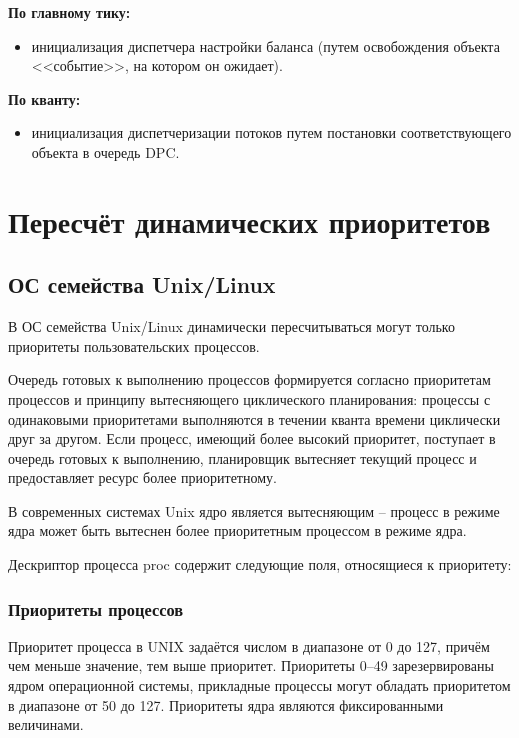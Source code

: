 \textbf{По главному тику:}
\begin{itemize}
	\item инициализация диспетчера настройки баланса (путем освобождения объекта <<событие>>, на котором он ожидает).
\end{itemize}

\textbf{По кванту:}
\begin{itemize}
	\item инициализация диспетчеризации потоков путем постановки соответствующего объекта в очередь {\ttfamily DPC}.
\end{itemize}

\chapter{Пересчёт динамических приоритетов}

\section{ОС семейства Unix/Linux}

В ОС семейства {\ttfamily Unix/Linux} динамически пересчитываться могут только приоритеты пользовательских процессов.

Очередь готовых к выполнению процессов формируется согласно приоритетам процессов и принципу вытесняющего циклического планирования: процессы с одинаковыми приоритетами выполняются в течении кванта времени циклически друг за другом. Если процесс, имеющий более высокий приоритет, поступает в очередь готовых к выполнению, планировщик вытесняет текущий процесс и предоставляет ресурс более приоритетному. 

В современных системах {\ttfamily Unix} ядро является вытесняющим – процесс в режиме ядра может быть вытеснен более приоритетным процессом в режиме ядра.

 

Дескриптор процесса proc содержит следующие поля, относящиеся к приоритету:

\subsection{Приоритеты процессов}

Приоритет процесса в {\ttfamily UNIX} задаётся числом в диапазоне от 0 до 127, причём чем меньше значение, тем выше приоритет. Приоритеты 0--49 зарезервированы ядром операционной системы, прикладные процессы могут обладать приоритетом в диапазоне от 50 до 127. Приоритеты ядра являются фиксированными величинами.

